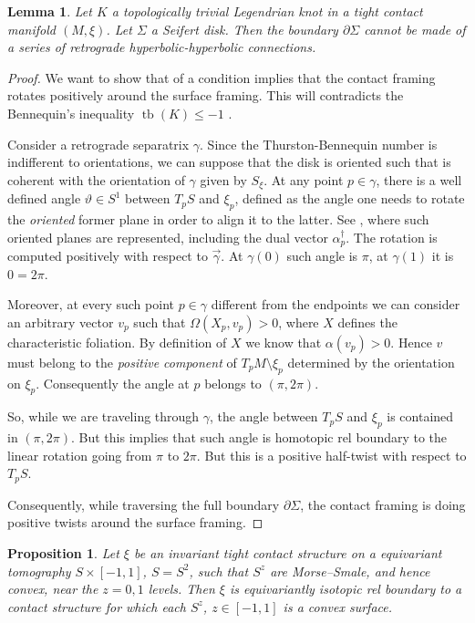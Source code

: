 \documentclass[a4paper, 11pt]{amsart}
\theoremstyle{plain}
\newtheorem{prop}{Proposition}[section]
\newtheorem{lemma}[lemma]{Lemma}
\theoremstyle{definition}
\renewcommand{\theta}{\vartheta}
\DeclareMathOperator{\tb}{tb}
\begin{document}
\begin{lemma}\label{nocircleretrograde}
	Let $K$ a topologically trivial Legendrian knot in a tight contact manifold $(M, \xi)$. Let $\Sigma$ a Seifert disk. Then the boundary $\partial \Sigma$ cannot be made of a series of retrograde hyperbolic-hyperbolic connections.
\end{lemma}
\begin{proof}
	We want to show that of a condition implies that the contact framing rotates positively around the surface framing. This will contradicts the Bennequin's inequality $\tb(K) \le -1$ \cite[Thm.\ 4.6.36]{geigesIntroductionContactTopology2008}. 
	
	Consider a retrograde separatrix $\gamma$. Since the Thurston-Bennequin number is indifferent to orientations, we can suppose that the disk is oriented such that is coherent with the orientation of $\gamma$ given by $S_\xi$. At any point $p \in \gamma$, there is a well defined angle $\theta \in S^1$ between $T_pS$ and $\xi_p$, defined as the angle one needs to rotate the \emph{oriented} former plane in order to align it to the latter. See , where such oriented planes are represented, including the dual vector $\alpha_p^\dagger$.  The rotation is computed positively with respect to $\vec{\gamma}$. At $\gamma(0)$ such angle is $\pi$, at $\gamma(1)$ it is $0 = 2\pi$.
	
	Moreover, at every such point $p \in \gamma$ different from the endpoints we can consider an arbitrary vector $v_p$ such that $\Omega(X_p,v_p) > 0$, where $X$ defines the characteristic foliation. By definition of $X$ we know that $\alpha(v_p) > 0$. Hence $v$ must belong to the \emph{positive component} of $T_pM \setminus \xi_p$ determined by the orientation on $\xi_p$. Consequently the angle at $p$ belongs to $(\pi,2\pi)$.
	
	So, while we are traveling through $\gamma$, the angle between $T_pS$ and $\xi_p$ is contained in $(\pi,2\pi)$. But this implies that such angle is homotopic rel boundary to the linear rotation going from $\pi$ to $2\pi$. But this is a positive half-twist with respect to $T_pS$.

	Consequently, while traversing the full boundary $\partial \Sigma$, the contact framing is doing positive twists around the surface framing.
\end{proof}
\begin{prop}\label{maketomographyallconvex}
	Let $\xi$ be an invariant tight contact structure on a equivariant tomography $S \times [-1,1]$, $S  = S^2$, such that $S^{z}$ are Morse--Smale, and hence convex, near the $z = 0,1$ levels. Then $\xi$ is equivariantly isotopic rel boundary to a contact structure for which each $S^z$, $z \in [-1,1]$ is a convex surface.
\end{prop}
\end{document}
